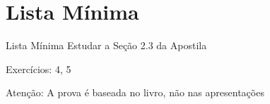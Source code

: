 \section{Lista Mínima}

\begin{frame}{Lista Mínima}
  Estudar a Seção 2.3 da Apostila

  Exercícios: 4, 5

  \vfill
  Atenção: A prova é baseada no livro, não nas apresentações
\end{frame}


